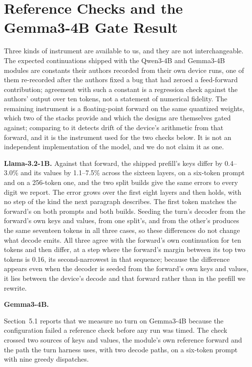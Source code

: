 \documentclass{article}
\begin{document}
\section{Reference Checks and the Gemma3-4B Gate Result}
\label{app:gemma-gate}

Three kinds of instrument are available to us, and they are not interchangeable. The expected continuations shipped
with the Qwen3-4B and Gemma3-4B modules are constants their authors recorded from their own device runs, one of them
re-recorded after the authors fixed a bug that had zeroed a feed-forward contribution; agreement with such a constant
is a regression check against the authors' output over ten tokens, not a statement of numerical fidelity. The
remaining instrument is a floating-point forward on the same quantized weights, which two of the stacks provide and
which the designs are themselves gated against; comparing to it detects drift of the device's arithmetic from that
forward, and it is the instrument used for the two checks below. It is not an independent implementation of the
model, and we do not claim it as one.

\textbf{Llama-3.2-1B.} Against that forward, the shipped prefill's keys differ by 0.4--3.0\% and its values by
1.1--7.5\% across the sixteen layers, on a six-token prompt and on a 256-token one, and the two split builds give the
same errors to every digit we report. The error grows over the first eight layers and then holds, with no step of the
kind the next paragraph describes. The first token matches the forward's on both prompts and both builds. Seeding the
turn's decoder from the forward's own keys and values, from one split's, and from the other's produces the same
seventeen tokens in all three cases, so these differences do not change what decode emits. All three agree with the
forward's own continuation for ten tokens and then differ, at a step where the forward's margin between its top two
tokens is 0.16, its second-narrowest in that sequence; because the difference appears even when the decoder is seeded
from the forward's own keys and values, it lies between the device's decode and that forward rather than in the
prefill we rewrite.

\textbf{Gemma3-4B.}

Section~5.1 reports that we measure no turn on Gemma3-4B because the configuration failed a reference check before any
run was timed. The check crossed two sources of keys and values, the module's own reference forward and the path the
turn harness uses, with two decode paths, on a six-token prompt with nine greedy dispatches.
\end{document}

